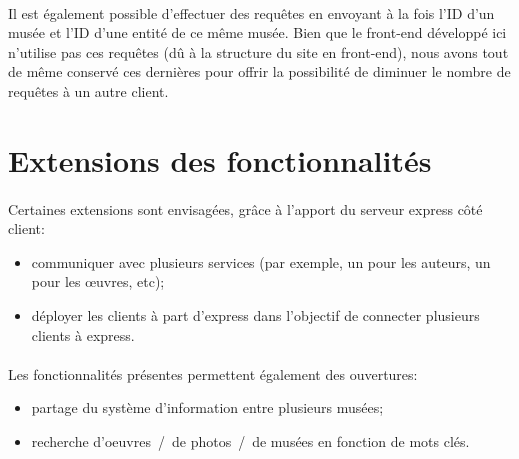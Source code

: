 \paragraph{}
Il est également possible d'effectuer des requêtes en envoyant à la fois l'ID d'un musée et l'ID d'une entité de ce même musée. Bien que le front-end développé ici n'utilise pas ces requêtes (dû à la structure du site en front-end), nous avons tout de même conservé ces dernières pour offrir la possibilité de diminuer le nombre de requêtes à un autre client.

\section{Extensions des fonctionnalités}
\paragraph{}
Certaines extensions sont envisagées, grâce à l'apport du serveur express côté client:
\begin{itemize}
\item communiquer avec plusieurs services (par exemple, un pour les auteurs, un pour les \oe{}uvres, etc);
\item déployer les clients à part d'express dans l'objectif de connecter plusieurs clients à express.
\end{itemize}

\paragraph{}
Les fonctionnalités présentes permettent également des ouvertures:
\begin{itemize}
\item partage du système d'information entre plusieurs musées;
\item recherche d'oeuvres~/~de photos~/~de musées en fonction de mots clés.
\end{itemize}